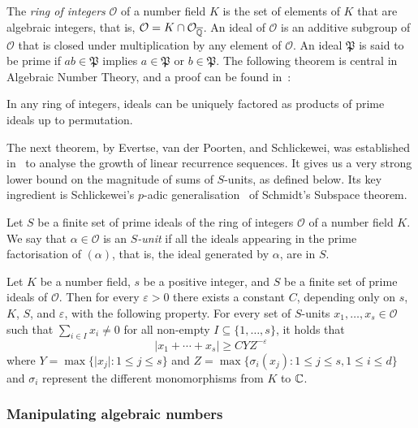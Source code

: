 The \emph{ring of integers} $\mathcal{O}$ of a number field $K$ is the set of elements of $K$ that are algebraic integers, that is, $\mathcal{O}=K\cap\mathcal{O}_{\overline{\mathbb{Q}}}$.
An ideal of $\mathcal{O}$ is an additive subgroup of $\mathcal{O}$ that is closed under multiplication by any element of $\mathcal{O}$. An ideal $\mathfrak{P}$ is said to be prime if $ab\in \mathfrak{P}$ implies $a\in\mathfrak{P}$ or $b\in\mathfrak{P}$. The following theorem is central in Algebraic Number Theory, and a proof can be found in~\cite{SnT}:

\begin{theorem}
In any ring of integers, ideals can be uniquely factored as products of prime ideals up to permutation.
\end{theorem}

The next theorem, by Evertse, van der Poorten, and Schlickewei, was established in~\cite{Evertse84,PS82} to analyse the growth of linear recurrence sequences. It gives us a very strong lower bound on the magnitude of sums of $S$-units, as defined below. Its key ingredient is Schlickewei's $p$-adic generalisation~\cite{Sch77} of Schmidt's Subspace theorem.

Let $S$ be a finite set of prime ideals of the ring of integers
$\mathcal{O}$ of a number field $K$. We say that
$\alpha\in\mathcal{O}$ is an \emph{$S$-unit} if all the ideals
appearing in the prime factorisation of $(\alpha)$, that is, the ideal generated by $\alpha$, are in $S$.

\begin{theorem}[$S$-units]
\label{thm:s-units}
Let $K$ be a number field, $s$ be a positive integer, and $S$ be a
finite set of prime ideals of $\mathcal{O}$. Then for every
$\varepsilon>0$ there exists a constant $C$, depending only on $s$,
$K$, $S$, and $\varepsilon$, with the following property. For every
set of $S$-units $x_1,\ldots,x_s\in\mathcal{O}$ such that
$\sum\limits_{i\in I} x_i\neq 0$ for all non-empty $I\subseteq\lbrace
1,\ldots,s\rbrace$, it holds that
\[ \lvert x_1+\cdots+x_s \rvert\geq CYZ^{-\varepsilon} \]
where $Y=\max\lbrace \lvert x_j\rvert : 1\leq j\leq s \rbrace$ and $Z=\max\lbrace \sigma_i(x_j): 1\leq j\leq s,1\leq i\leq d \rbrace$ and $\sigma_i$ represent the different monomorphisms from $K$ to $\mathbb{C}$.
\end{theorem}

\subsubsection{Manipulating algebraic numbers}

